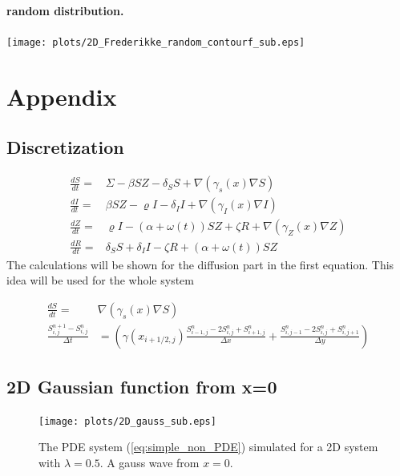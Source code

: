 \documentclass[%
twoside,                 %
final,                   %
10pt]{article}
\begin{document}
\noindent
\paragraph{random distribution.}
\begin{center}  %
  \centerline{\texttt{[image: plots/2D\_Frederikke\_random\_contourf\_sub.eps]}}
\end{center}





\section{Appendix}
\subsection{Discretization}
\begin{equation} \label{eq:LMR_model}
	\begin{aligned} 
	\frac{dS}{dt} =& \Sigma -\beta SZ - \delta_SS + \nabla(\gamma_s(x)\nabla S) \\
	\frac{dI}{dt} =& \beta SZ - \varrho I - \delta_II+\nabla(\gamma_I(x)\nabla I)\\
	\frac{dZ}{dt} =& \varrho I- (\alpha+\omega(t))SZ + \zeta R+ \nabla(\gamma_Z(x)\nabla Z)\\
	\frac{dR}{dt} =& \delta_SS +\delta_II -\zeta R + (\alpha+\omega(t))SZ 
	\end{aligned}
\end{equation}
The calculations will be shown for the diffusion part in the first equation. This idea will be used for the whole system

\begin{equation}
	\begin{aligned}
	\frac{dS}{dt} =& \nabla(\gamma_s(x)\nabla S) \\
    \frac{S^{n+1}_{i,j}-S^n_{i,j}}{\Delta t} &= \left(\gamma(x_{i+1/2,j})\frac{S^{n}_{i-1,j}-2S^{n}_{i,j}+S^{n}_{i+1,j}}{\Delta x}+\frac{S^{n}_{i,j-1}-2S^{n}_{i,j}+S^{n}_{i,j+1}}{\Delta y}\right) 
	\end{aligned}
\end{equation}
\subsection{2D Gaussian function from x=0}


\begin{figure}[ht]
  \centerline{\texttt{[image: plots/2D\_gauss\_sub.eps]}}
  \caption{
  The PDE system (\ref{eq:simple_non_PDE}) simulated for a 2D system with $\lambda=0.5$. A gauss wave from $x=0$.
  }
\end{figure}
\end{document}
